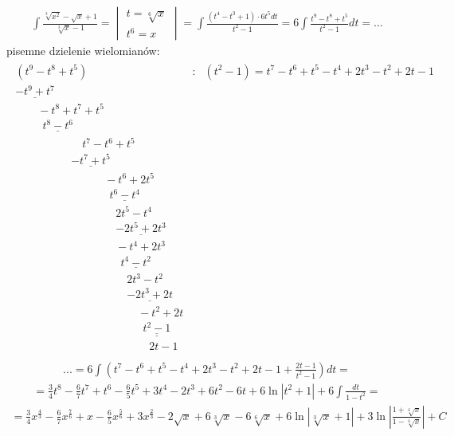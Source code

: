 \begin{gather*}\int \frac{\sqrt[3]{x^2}-\sqrt{x}+1}{\sqrt[3]{x}-1} = \begin{vmatrix}
t=\sqrt[6]{x} \\
t^6=x\end{vmatrix} = \int \frac{(t^4-t^3+1)\cdot 6t^5dt}{t^2-1} = 6\int \frac{t^9-t^8+t^5}{t^2-1}dt=... \end{gather*}
pisemne dzielenie wielomianów:
\begin{gather*} \nonumber \begin{array}{lll}
(t^9-t^8+t^5) & : & (t^2-1)  =  t^7-t^6+t^5-t^4+2t^3-t^2+2t-1 \\
\underline{-t^9+t^7} & &  \\
\qquad -t^8+t^7+t^5& & \\
\qquad \ \ \underline{t^8-t^6} & &\\
\qquad \qquad \qquad t^7-t^6+t^5 & & \\
\qquad \qquad \quad \underline{-t^7+t^5}  & & \\
\qquad \qquad \qquad \qquad -t^6+2t^5 & & \\
\qquad \qquad \qquad \qquad \ \ \underline{t^6-t^4} & & \\
\qquad \qquad \qquad \qquad \quad 2t^5-t^4 & & \\
\qquad \qquad \qquad \qquad \quad \underline{-2t^5+2t^3} & & \\
\qquad \qquad \qquad \qquad \quad -t^4+2t^3 & & \\
\qquad \qquad \qquad \qquad \quad \ \ \underline{t^4-t^2} & & \\
\qquad \qquad \qquad \qquad \quad \quad 2t^3-t^2 & & \\
\qquad \qquad \qquad \qquad \quad \quad \underline{-2t^3+2t} & & \\
\qquad \qquad \qquad \qquad \quad \quad \quad -t^2+2t & & \\
\qquad \qquad \qquad \qquad \quad \quad \quad \ \ \underline{\underline{t^2-1}}& & \\
\qquad \qquad \qquad \qquad \quad \quad \quad \quad 2t-1& & \\
\end{array}\end{gather*}
\begin{gather*} \nonumber ...=6 \int \left(t^7-t^6+t^5-t^4+2t^3-t^2+2t-1+\frac{2t-1}{t^2-1}\right)dt = \end{gather*}
\begin{gather*}= \frac{3}{4}t^8-\frac{6}{7}t^7+t^6-\frac{6}{5}t^5+3t^4-2t^3+6t^2-6t+6\ln|t^2+1|+6\int \frac{dt}{1-t^2} = \end{gather*}
\begin{gather*}= \frac{3}{4}x^{\frac{4}{3}}-\frac{6}{7}x^{\frac{7}{6}}+x-\frac{6}{5}x^{\frac{5}{6}} +3x^{\frac{2}{3}}-2\sqrt{x}+6\sqrt[3]{x}-6\sqrt[6]{x}+6\ln|\sqrt[3]{x}+1| +3\ln\left|\frac{1+\sqrt[6]{x}}{1-\sqrt[6]{x}}\right|+C
\end{gather*}

